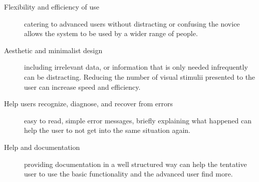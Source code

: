 \begin{description}
	\item[Flexibility and efficiency of use] catering to advanced users without
		distracting or confusing the novice allows the system to be used by a
		wider range of people.

	\item[Aesthetic and minimalist design] including irrelevant data, or
		information that is only needed infrequently can be distracting.
		Reducing the number of visual stimulii presented to the user can
		increase speed and efficiency.

	\item[Help users recognize, diagnose, and recover from errors] easy to
		read, simple error messages, briefly explaining what happened can help
		the user to not get into the same situation again.

	\item[Help and documentation] providing documentation in a well structured
		way can help the tentative user to use the basic functionality and the
		advanced user find more.

\end{description}
